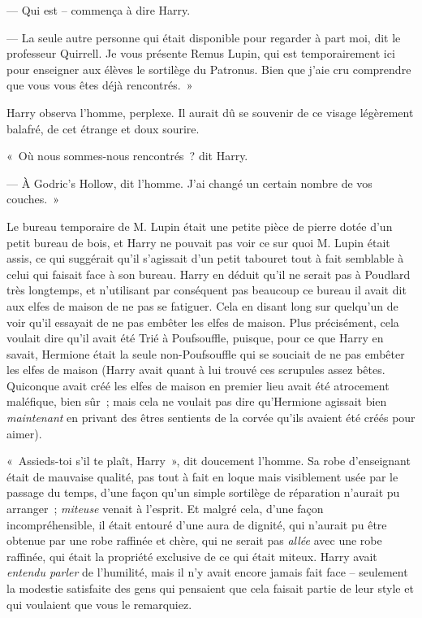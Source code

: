 --- Qui est -- commença à dire Harry.

--- La seule autre personne qui était disponible pour regarder à part moi, dit le professeur Quirrell. Je vous présente Remus Lupin, qui est temporairement ici pour enseigner aux élèves le sortilège du Patronus. Bien que j'aie cru comprendre que vous vous êtes déjà rencontrés.~»

Harry observa l'homme, perplexe. Il aurait dû se souvenir de ce visage légèrement balafré, de cet étrange et doux sourire.

«~Où nous sommes-nous rencontrés~? dit Harry.

--- À Godric's Hollow, dit l'homme. J'ai changé un certain nombre de vos couches.~»

\later

Le bureau temporaire de M. Lupin était une petite pièce de pierre dotée d'un petit bureau de bois, et Harry ne pouvait pas voir ce sur quoi M. Lupin était assis, ce qui suggérait qu'il s'agissait d'un petit tabouret tout à fait semblable à celui qui faisait face à son bureau. Harry en déduit qu'il ne serait pas à Poudlard très longtemps, et n'utilisant par conséquent pas beaucoup ce bureau il avait dit aux elfes de maison de ne pas se fatiguer. Cela en disant long sur quelqu'un de voir qu'il essayait de ne pas embêter les elfes de maison. Plus précisément, cela voulait dire qu'il avait été Trié à Poufsouffle, puisque, pour ce que Harry en savait, Hermione était la seule non-Poufsouffle qui se souciait de ne pas embêter les elfes de maison (Harry avait quant à lui trouvé ces scrupules assez bêtes. Quiconque avait créé les elfes de maison en premier lieu avait été atrocement maléfique, bien sûr~; mais cela ne voulait pas dire qu'Hermione agissait bien \emph{maintenant} en privant des êtres sentients de la corvée qu'ils avaient été créés pour aimer).

«~Assieds-toi s'il te plaît, Harry~», dit doucement l'homme. Sa robe d'enseignant était de mauvaise qualité, pas tout à fait en loque mais visiblement usée par le passage du temps, d'une façon qu'un simple sortilège de réparation n'aurait pu arranger~; \emph{miteuse} venait à l'esprit. Et malgré cela, d'une façon incompréhensible, il était entouré d'une aura de dignité, qui n'aurait pu être obtenue par une robe raffinée et chère, qui ne serait pas \emph{allée} avec une robe raffinée, qui était la propriété exclusive de ce qui était miteux. Harry avait \emph{entendu parler} de l'humilité, mais il n'y avait encore jamais fait face -- seulement la modestie satisfaite des gens qui pensaient que cela faisait partie de leur style et qui voulaient que vous le remarquiez.

